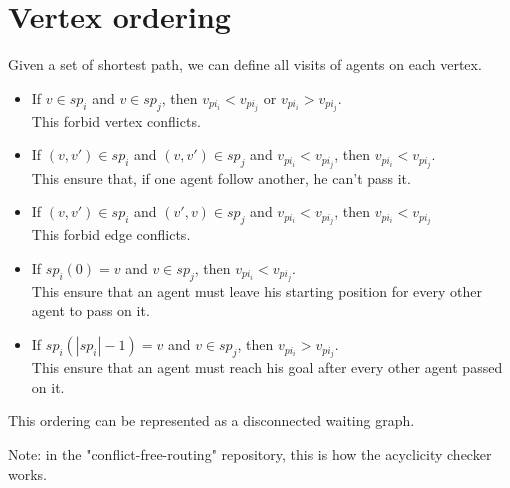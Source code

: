 \section{Vertex ordering}\label{sec:background}

Given a set of shortest path, we can define all visits of agents on each vertex.

\begin{itemize}
  \item If $v \in sp_i$ and $v \in sp_j$, then $v_{pi_i}<v_{pi_j}$ or $v_{pi_i}>v_{pi_j}$.
  \\ This forbid vertex conflicts.
  \item If $(v,v') \in sp_i$ and $(v,v') \in sp_j$ and $v_{pi_i} < v_{pi_j}$, then $v_{pi_i} < v_{pi_j}$. \\ This ensure that, if one agent follow another, he can't pass it.
  \item If $(v,v') \in sp_i$ and $(v',v) \in sp_j$ and $v_{pi_i} < v_{pi_j}$, then $v_{pi_i} < v_{pi_j}$ \\ This forbid edge conflicts.
  \item If $sp_i(0)=v$ and $v \in sp_j$, then $v_{pi_i} < v_{pi_j}$. \\ This ensure that an agent must leave his starting position for every other agent to pass on it.
  \item If $sp_i(|sp_i|-1)=v$ and $v \in sp_j$, then $v_{pi_i} > v_{pi_j}$. \\ This ensure that an agent must reach his goal after every other agent passed on it.
\end{itemize}

This ordering can be represented as a disconnected waiting graph.

Note: in the "conflict-free-routing" repository, this is how the acyclicity checker works.
